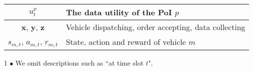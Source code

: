 \begin{table}[t]
\begin{threeparttable}
\begin{tabular}{c p{6cm}}
\midrule
{$u_{t}^p$} & The data utility of the PoI $p$\\

\midrule
{$\textbf{x}$, $\textbf{y}$, $\textbf{z}$} & Vehicle dispatching, order accepting, data collecting\\


\midrule
{$s_{m,t}$, $a_{m,t}$, $r_{m,t}$} & State, action and reward of vehicle $m$\\

\bottomrule
\end{tabular}
\begin{tablenotes}   
        \footnotesize               
        \item[1] $\bullet$ We omit descriptions such as ``at time slot $t$".     
      \end{tablenotes}           
    \end{threeparttable}

\end{table}

